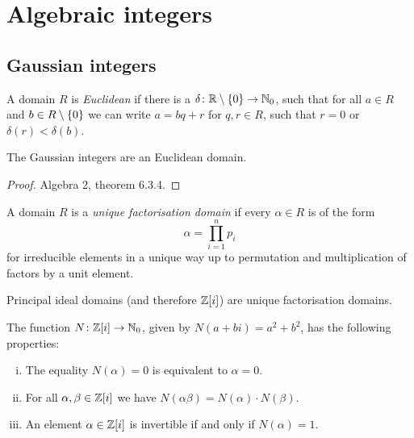 \section{Algebraic integers}

\subsection{Gaussian integers}


\begin{definicija}
A domain $R$ is \emph{Euclidean} if there
is a $\delta \colon \mathbb{R} \setminus \left\{0\right\} \to \mathbb{N}_0$, such that for
all $a \in R$ and $b \in R \setminus \left\{0\right\}$ we can write
$a = bq + r$ for $q, r \in R$, such that $r = 0$ or
$\delta(r) < \delta(b)$.
\end{definicija}

\begin{trditev}
The Gaussian integers are an Euclidean domain.
\end{trditev}

\begin{proof}
Algebra 2, theorem 6.3.4.
\end{proof}

\begin{definicija}
A domain $R$ is a
\emph{unique factorisation domain}
if every $\alpha \in R$ is of the form
\[
\alpha = \prod_{i=1}^n p_i
\]
for irreducible elements in a unique way up to permutation and
multiplication of factors by a unit element.
\end{definicija}

\begin{opomba}
Principal ideal domains (and therefore $\mathbb{Z}[i]$) are unique
factorisation domains.
\end{opomba}

\begin{lema}
The function $N \colon \mathbb{Z}[i] \to \mathbb{N}_0$, given by
$N(a + bi) = a^2 + b^2$, has the following properties:

\begin{enumerate}[i)]
\item The equality $N(\alpha) = 0$ is equivalent to $\alpha = 0$.
\item For all $\alpha, \beta \in \mathbb{Z}[i]$ we have
$N(\alpha \beta) = N(\alpha) \cdot N(\beta)$.
\item An element $\alpha \in \mathbb{Z}[i]$ is invertible if and only if
$N(\alpha) = 1$.
\end{enumerate}
\end{lema}

